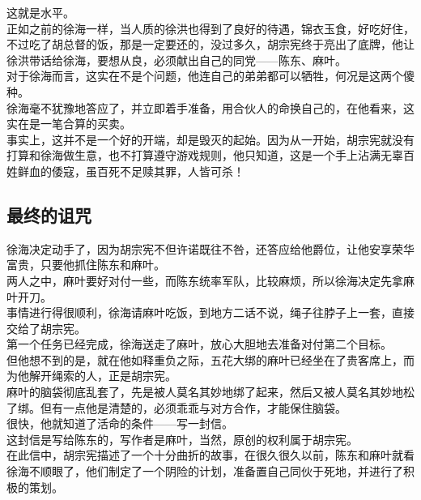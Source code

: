 \begin{multicols}{\theparacolNo}
这就是水平。\\

正如之前的徐海一样，当人质的徐洪也得到了良好的待遇，锦衣玉食，好吃好住，不过吃了胡总督的饭，那是一定要还的，没过多久，胡宗宪终于亮出了底牌，他让徐洪带话给徐海，要想从良，必须献出自己的同党——陈东、麻叶。\\

对于徐海而言，这实在不是个问题，他连自己的弟弟都可以牺牲，何况是这两个傻种。\\

徐海毫不犹豫地答应了，并立即着手准备，用合伙人的命换自己的，在他看来，这实在是一笔合算的买卖。\\

事实上，这并不是一个好的开端，却是毁灭的起始。因为从一开始，胡宗宪就没有打算和徐海做生意，也不打算遵守游戏规则，他只知道，这是一个手上沾满无辜百姓鲜血的倭寇，虽百死不足赎其罪，人皆可杀！\\

\subsection{最终的诅咒}
徐海决定动手了，因为胡宗宪不但许诺既往不咎，还答应给他爵位，让他安享荣华富贵，只要他抓住陈东和麻叶。\\

两人之中，麻叶要好对付一些，而陈东统率军队，比较麻烦，所以徐海决定先拿麻叶开刀。\\

事情进行得很顺利，徐海请麻叶吃饭，到地方二话不说，绳子往脖子上一套，直接交给了胡宗宪。\\

第一个任务已经完成，徐海送走了麻叶，放心大胆地去准备对付第二个目标。\\

但他想不到的是，就在他如释重负之际，五花大绑的麻叶已经坐在了贵客席上，而为他解开绳索的人，正是胡宗宪。\\

麻叶的脑袋彻底乱套了，先是被人莫名其妙地绑了起来，然后又被人莫名其妙地松了绑。但有一点他是清楚的，必须乖乖与对方合作，才能保住脑袋。\\

很快，他就知道了活命的条件——写一封信。\\

这封信是写给陈东的，写作者是麻叶，当然，原创的权利属于胡宗宪。\\

在此信中，胡宗宪描述了一个十分曲折的故事，在很久很久以前，陈东和麻叶就看徐海不顺眼了，他们制定了一个阴险的计划，准备置自己同伙于死地，并进行了积极的策划。\\


\end{multicols}
